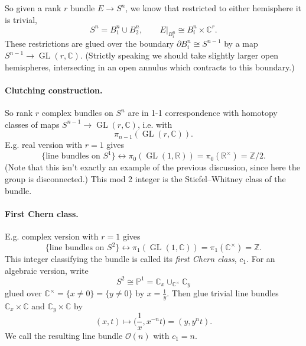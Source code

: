 \documentclass{article}
\theoremstyle{definition}
\DeclareMathOperator{\GL}{GL}
\renewcommand{\O}{\mathcal{O}}
\renewcommand{\P}{\mathbb{P}}
\newcommand{\Z}{\mathbb{Z}}
\newcommand{\R}{\mathbb{R}}
\newcommand{\C}{\mathbb{C}}
\begin{document}
So given a rank $r$ bundle $E\to S^n$, we know that restricted to either
hemisphere it is trivial,
\begin{equation*}
    S^n = B^n_1\cup B^n_2, \qquad E|_{B^n_i}\cong B^n_i\times\C^r.
\end{equation*}
These restrictions are glued over the boundary $\partial B^n_i\cong S^{n-1}$ by
a map $S^{n-1}\to\GL(r,\C)$. (Strictly speaking we should take slightly larger
open hemispheres, intersecting in an open annulus which contracts to this
boundary.)

\paragraph{Clutching construction.}

So rank $r$ complex bundles on $S^n$ are in 1-1 correspondence with homotopy
classes of maps $S^{n-1}\to\GL(r,\C)$, i.e. with
\begin{equation*}
    \pi_{n-1}(\GL(r,\C)).
\end{equation*}
E.g. real version with $r=1$ gives
\begin{equation*}
    \{\text{line bundles on $S^1$}\}
        \leftrightarrow \pi_0(\GL(1,\R))
        = \pi_0(\R^\times)
        = \Z/2.
\end{equation*}
(Note that this isn't exactly an example of the previous discussion, since here
the group is disconnected.) This mod 2 integer is the Stiefel--Whitney class of
the bundle.

\paragraph{First Chern class.}
E.g. complex version with $r=1$ gives
\begin{equation*}
    \{\text{line bundles on $S^2$}\}
        \leftrightarrow \pi_1(\GL(1,\C)) = \pi_1(\C^\times) = \Z.
\end{equation*}
This integer classifying the bundle is called its \emph{first Chern class},
$c_1$. For an algebraic version, write
\begin{equation*}
    S^2 \cong \P^1 = \C_x\cup_{\C^\times}\C_y
\end{equation*}
glued over $\C^\times=\{x\ne0\}=\{y\ne0\}$ by $x=\frac{1}{y}$. Then glue trivial
line bundles $\C_x\times\C$ and $\C_y\times\C$ by
\begin{equation*}
    (x,t) \mapsto \biggl(\frac{1}{x},x^{-n}t\biggr) = (y,y^nt).
\end{equation*}
We call the resulting line bundle $\O(n)$ with $c_1=n$.
\end{document}
